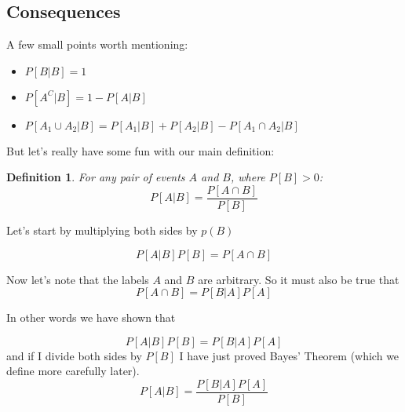 \documentclass[12pt]{extbook}
\newtheorem{df}{Definition}[section]
\begin{document}


 
\subsection{Consequences}

A few small points worth mentioning:

\begin{itemize}
\item $P[B|B] = 1$
\item $P[A^C|B] = 1 - P[A|B]$
\item $P[A_1 \cup A_2 | B] = P[A_1|B] + P[A_2|B] - P[A_1 \cap A_2 | B]$
\end{itemize}

But let's really have some fun with our main definition:



\begin{df}
For any pair of events $A$ and $B$, where $P[B] > 0$:
\begin{displaymath}
P[A|B] = \frac{P[A \cap B]}{P[B]}
\end{displaymath}
\end{df}


 

Let's start by multiplying both sides by $p(B)$

\begin{displaymath}
P[A|B]P[B] = P[A \cap B]
\end{displaymath}

Now let's note that the labels $A$ and $B$ are arbitrary.   So it must also be true that
\begin{displaymath}
P[A \cap B] = P[B|A]P[A]
\end{displaymath}

In other words we have shown that

\begin{displaymath}
P[A|B]P[B] =  P[B|A]P[A]
\end{displaymath}
and if I divide both sides by $P[B]$ I have just proved Bayes' Theorem (which we define more carefully later).
\begin{displaymath}
P[A|B] = \frac{P[B|A]P[A]}{P[B]}
\end{displaymath}
\end{document}
